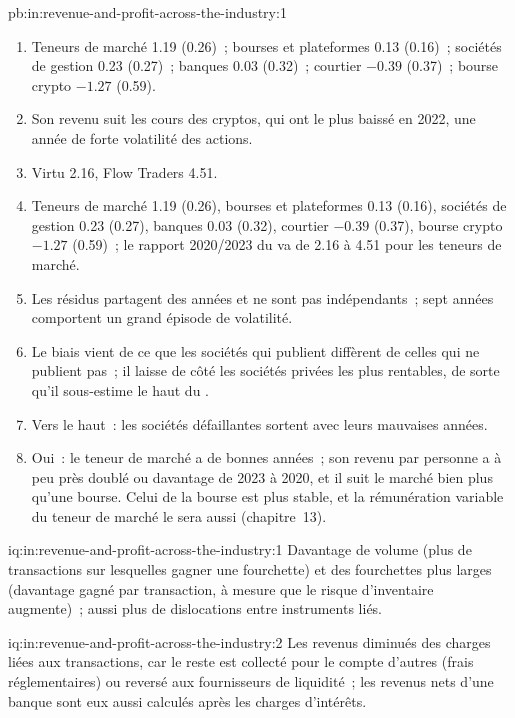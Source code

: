 \begin{solution}{pb:in:revenue-and-profit-across-the-industry:1}
\begin{enumerate}
pentes proviennent des variations à l'intérieur des sociétés.
\item Teneurs de marché 1.19 (0.26)~; bourses et plateformes 0.13 (0.16)~; sociétés de gestion 0.23 (0.27)~; banques 0.03 (0.32)~;
courtier $-0.39$ (0.37)~; bourse crypto $-1.27$ (0.59).
\item Son revenu suit les cours des cryptos, qui ont le plus baissé en 2022, une année de forte volatilité des actions.
\item Virtu 2.16, Flow Traders 4.51.
\item Teneurs de marché 1.19 (0.26), bourses et plateformes 0.13 (0.16), sociétés de gestion 0.23 (0.27), banques 0.03 (0.32),
courtier $-0.39$ (0.37), bourse crypto $-1.27$ (0.59)~; le rapport 2020/2023 du  va de 2.16 à 4.51
pour les teneurs de marché.
\item Les résidus partagent des années et ne sont pas indépendants~; sept années comportent un grand épisode de volatilité.
\item Le biais vient de ce que les sociétés qui publient diffèrent de celles qui ne publient pas~; il laisse de côté les sociétés privées les plus
rentables, de sorte qu'il sous-estime le haut du .
\item Vers le haut~: les sociétés défaillantes sortent avec leurs mauvaises années.
\item Oui~: le teneur de marché a de bonnes années~; son revenu par personne a à peu près doublé ou davantage de 2023 à 2020, et il suit le marché bien plus qu'une
bourse. Celui de la bourse est plus stable, et la rémunération variable du teneur de marché le sera aussi
(chapitre~13).
\end{enumerate}
\end{solution}

\begin{solution}{iq:in:revenue-and-profit-across-the-industry:1}
Davantage de volume (plus de transactions sur lesquelles gagner une fourchette) et des fourchettes plus larges (davantage gagné par transaction, à mesure que le risque d'inventaire augmente)~; aussi
plus de dislocations entre instruments liés.
\end{solution}

\begin{solution}{iq:in:revenue-and-profit-across-the-industry:2}
Les revenus diminués des charges liées aux transactions, car le reste est collecté pour le compte d'autres (frais réglementaires) ou reversé aux
fournisseurs de liquidité~; les revenus nets d'une banque sont eux aussi calculés après les charges d'intérêts.
\end{solution}

